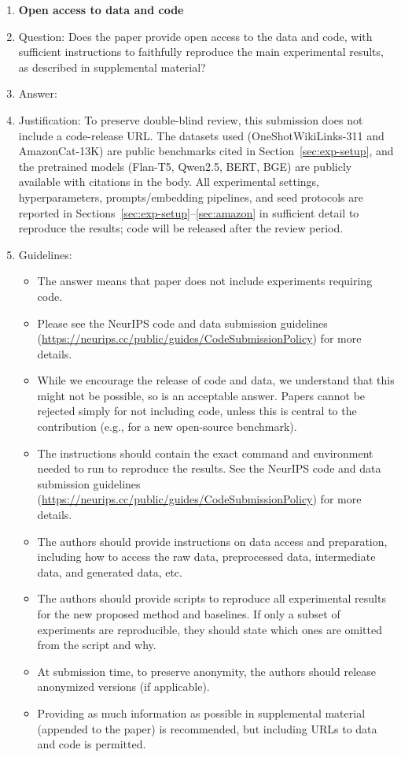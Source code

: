\documentclass{article}
\theoremstyle{definition}
\theoremstyle{remark}
\theoremstyle{remark}
\begin{document}
\begin{enumerate}
\item {\bf Open access to data and code}
    \item[] Question: Does the paper provide open access to the data and code, with sufficient instructions to faithfully reproduce the main experimental results, as described in supplemental material?
    \item[] Answer: \answerNo{} %
    \item[] Justification: To preserve double-blind review, this submission does not include a code-release URL. The datasets used (OneShotWikiLinks-311 and AmazonCat-13K) are public benchmarks cited in Section~\ref{sec:exp-setup}, and the pretrained models (Flan-T5, Qwen2.5, BERT, BGE) are publicly available with citations in the body. All experimental settings, hyperparameters, prompts/embedding pipelines, and seed protocols are reported in Sections~\ref{sec:exp-setup}--\ref{sec:amazon} in sufficient detail to reproduce the results; code will be released after the review period.
    \item[] Guidelines:
    \begin{itemize}
        \item The answer \answerNA{} means that paper does not include experiments requiring code.
        \item Please see the NeurIPS code and data submission guidelines (\url{https://neurips.cc/public/guides/CodeSubmissionPolicy}) for more details.
        \item While we encourage the release of code and data, we understand that this might not be possible, so \answerNo{} is an acceptable answer. Papers cannot be rejected simply for not including code, unless this is central to the contribution (e.g., for a new open-source benchmark).
        \item The instructions should contain the exact command and environment needed to run to reproduce the results. See the NeurIPS code and data submission guidelines (\url{https://neurips.cc/public/guides/CodeSubmissionPolicy}) for more details.
        \item The authors should provide instructions on data access and preparation, including how to access the raw data, preprocessed data, intermediate data, and generated data, etc.
        \item The authors should provide scripts to reproduce all experimental results for the new proposed method and baselines. If only a subset of experiments are reproducible, they should state which ones are omitted from the script and why.
        \item At submission time, to preserve anonymity, the authors should release anonymized versions (if applicable).
        \item Providing as much information as possible in supplemental material (appended to the paper) is recommended, but including URLs to data and code is permitted.
    \end{itemize}



\end{enumerate}
\end{document}
